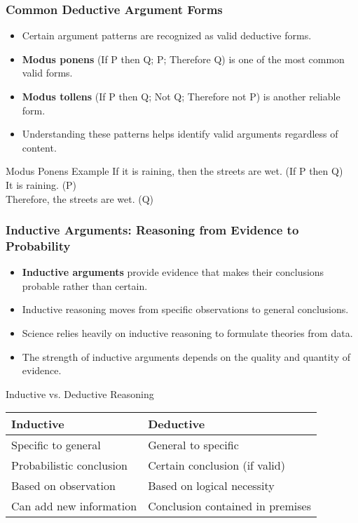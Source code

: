 \documentclass{beamer}
\begin{document}
\begin{frame}
    \frametitle{Common Deductive Argument Forms}
    \begin{itemize}
        \item Certain argument patterns are recognized as valid deductive forms.
        \item \textbf{Modus ponens} (If P then Q; P; Therefore Q) is one of the most common valid forms.
        \item \textbf{Modus tollens} (If P then Q; Not Q; Therefore not P) is another reliable form.
        \item Understanding these patterns helps identify valid arguments regardless of content.
    \end{itemize}
    
    \begin{exampleblock}{Modus Ponens Example}
        If it is raining, then the streets are wet. (If P then Q)\\
        It is raining. (P)\\
        Therefore, the streets are wet. (Q)
    \end{exampleblock}
\end{frame}

\begin{frame}
    \frametitle{Inductive Arguments: Reasoning from Evidence to Probability}
    \begin{itemize}
        \item \textbf{Inductive arguments} provide evidence that makes their conclusions probable rather than certain.
        \item Inductive reasoning moves from specific observations to general conclusions.
        \item Science relies heavily on inductive reasoning to formulate theories from data.
        \item The strength of inductive arguments depends on the quality and quantity of evidence.
    \end{itemize}
    
    \begin{block}{Inductive vs. Deductive Reasoning}
        \begin{tabular}{|l|l|}
            \hline
            \textbf{Inductive} & \textbf{Deductive} \\
            \hline
            Specific to general & General to specific \\
            Probabilistic conclusion & Certain conclusion (if valid) \\
            Based on observation & Based on logical necessity \\
            Can add new information & Conclusion contained in premises \\
            \hline
        \end{tabular}
    \end{block}
\end{frame}
\end{document}
